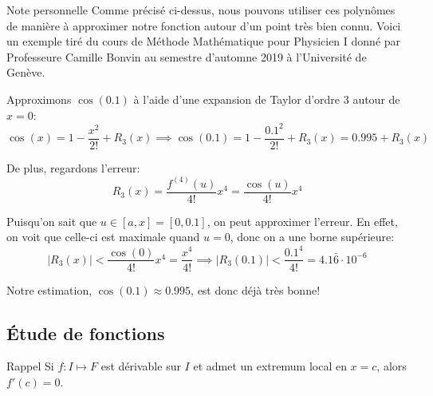 \documentclass[a4paper]{article}
\begin{document}
\begin{parag}{Note personnelle}
    Comme précisé ci-dessus, nous pouvons utiliser ces polynômes de manière à approximer notre fonction autour d'un point très bien connu. Voici un exemple tiré du cours de Méthode Mathématique pour Physicien I donné par Professeure Camille Bonvin au semestre d'automne 2019 à l'Université de Genève.

    Approximons $\cos\left(0.1\right)$ à l'aide d'une expansion de Taylor d'ordre $3$ autour de $x = 0$:
    \[\cos\left(x\right) = 1 - \frac{x^2}{2!} + R_3\left(x\right) \implies \cos\left(0.1\right) = 1 - \frac{0.1^2}{2!} + R_3\left(x\right) = 0.995 + R_3\left(x\right)\]

    De plus, regardons l'erreur:
    \[R_3\left(x\right) = \frac{f^{\left(4\right)}\left(u\right)}{4!} x^4 = \frac{\cos\left(u\right)}{4!} x^{4}\]

    Puisqu'on sait que $u \in \left[a, x\right] = \left[0, 0.1\right]$, on peut approximer l'erreur. En effet, on voit que celle-ci est maximale quand $u = 0$, donc on a une borne supérieure:
    \[\left|R_3\left(x\right)\right| < \frac{\cos\left(0\right)}{4!} x^4 = \frac{x^4}{4!} \implies \left|R_3\left(0.1\right)\right| < \frac{0.1^4}{4!} = 4.1\bar{6} \cdot 10^{-6}\]

    Notre estimation, $\cos\left(0.1\right) \approx 0.995$, est donc déjà très bonne!
\end{parag}

\subsection{Étude de fonctions}
\begin{parag}{Rappel}
    Si $f : I \mapsto F$ est dérivable sur $I$ et admet un extremum local en $x = c$, alors $f'\left(c\right) = 0$.
\end{parag}
\end{document}
